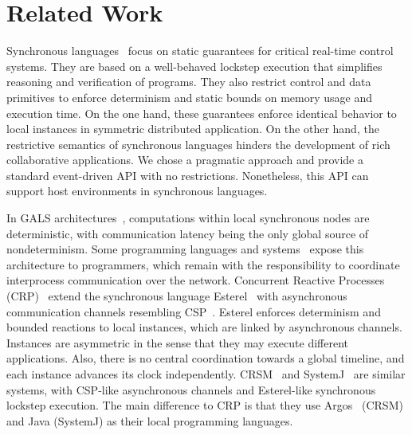\documentclass[sigplan,screen]{acmart}
\begin{document}
\section{Related Work}
\label{sec.related}

Synchronous languages~\cite{langs} focus on static guarantees for critical
real-time control systems.
They are based on a well-behaved lockstep execution that simplifies reasoning
and verification of programs.
They also restrict control and data primitives to enforce determinism and
static bounds on memory usage and execution time.
On the one hand, these guarantees enforce identical behavior to local instances
in symmetric distributed application.
On the other hand, the restrictive semantics of synchronous languages hinders
the development of rich collaborative applications.
We chose a pragmatic approach and provide a standard event-driven API with no
restrictions.
Nonetheless, this API can support host environments in synchronous languages.

In GALS architectures~\cite{gals.taxonomy}, computations within local
synchronous nodes are deterministic, with communication latency being the only
global source of nondeterminism.
Some programming languages and systems~\cite{gals.crp,gals.crsm,gals.systemj}
expose this architecture to programmers, which remain with the responsibility
to coordinate interprocess communication over the network.
%
Concurrent Reactive Processes (CRP)~\cite{gals.crp} extend the synchronous
language Esterel~\cite{esterel} with asynchronous communication
channels resembling CSP~\cite{csp}.
%
Esterel enforces determinism and bounded reactions to local instances, which
are linked by asynchronous channels.
Instances are asymmetric in the sense that they may execute different
applications.
Also, there is no central coordination towards a global timeline, and each
instance advances its clock independently.
%
CRSM~\cite{gals.crsm} and SystemJ~\cite{gals.systemj} are similar systems, with
CSP-like asynchronous channels and Esterel-like synchronous lockstep execution.
The main difference to CRP is that they use Argos~\cite{argos} (CRSM) and Java
(SystemJ) as their local programming languages.
\end{document}
